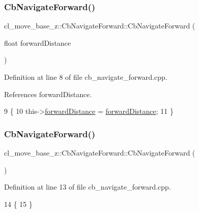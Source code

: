 \subsubsection{\texorpdfstring{Cb\+Navigate\+Forward()}{CbNavigateForward()}\hspace{0.1cm}{\footnotesize\ttfamily [1/2]}}
{\footnotesize\ttfamily cl\+\_\+move\+\_\+base\+\_\+z\+::\+Cb\+Navigate\+Forward\+::\+Cb\+Navigate\+Forward (\begin{DoxyParamCaption}\item[{float}]{forward\+Distance }\end{DoxyParamCaption})}



Definition at line 8 of file cb\+\_\+navigate\+\_\+forward.\+cpp.



References forward\+Distance.


\begin{DoxyCode}
9 \{
10   this->\hyperlink{classcl__move__base__z_1_1CbNavigateForward_a41bc9c319c64be6302f7365173ccd2c5}{forwardDistance} = \hyperlink{classcl__move__base__z_1_1CbNavigateForward_a41bc9c319c64be6302f7365173ccd2c5}{forwardDistance};
11 \}
\end{DoxyCode}
\mbox{\label{classcl__move__base__z_1_1CbNavigateForward_a6322be3ee8a23652a0a9dbe8e203d00e}} 
\subsubsection{\texorpdfstring{Cb\+Navigate\+Forward()}{CbNavigateForward()}\hspace{0.1cm}{\footnotesize\ttfamily [2/2]}}
{\footnotesize\ttfamily cl\+\_\+move\+\_\+base\+\_\+z\+::\+Cb\+Navigate\+Forward\+::\+Cb\+Navigate\+Forward (\begin{DoxyParamCaption}{ }\end{DoxyParamCaption})}



Definition at line 13 of file cb\+\_\+navigate\+\_\+forward.\+cpp.


\begin{DoxyCode}
14 \{
15 \}
\end{DoxyCode}


